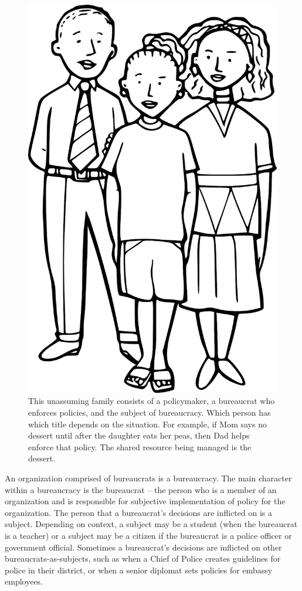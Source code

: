 \begin{figure}
    \centering
    \includegraphics[width=.6\textwidth]{images/family-father-mother-daughter-28725_1280_pixabay.png}
    \caption{This unassuming family consists of a policymaker, a bureaucrat who enforces policies, and the subject of bureaucracy. Which person has which title depends on the situation. For example, if Mom says no dessert until after the daughter eats her peas, then Dad helps enforce that policy. The shared resource being managed is the dessert. }
    \label{fig:family-of-bureaucrats}
\end{figure}

An organization comprised of bureaucrats is a \gls{bureaucracy}. \iftoggle{glossaryinmargin}{\marginpar{[Glossary]}}{}
The main character within a bureaucracy is the \gls{bureaucrat} -- the person who is a member of an organization and is responsible for subjective implementation of policy for the organization. The person that a bureaucrat's decisions are inflicted on is a \gls{subject}.  Depending on context, a subject may be a student (when the bureaucrat is a teacher)
or a subject may be a citizen if the bureaucrat is a police officer 
or government official. Sometimes a bureaucrat's decisions are inflicted on other bureaucrats-as-subjects, such as when a Chief of Police creates guidelines for police in their district, or when a senior diplomat sets policies for embassy employees. 


